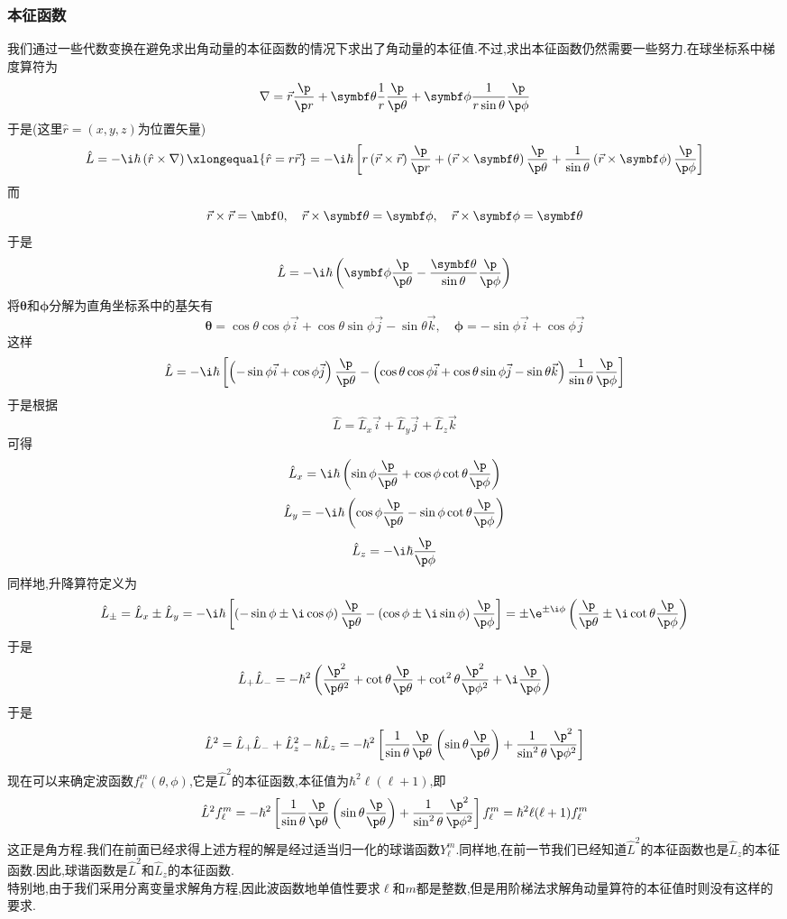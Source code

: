 \documentclass{ctexart}
\begin{document}
\subsubsection{本征函数}
我们通过一些代数变换在避免求出角动量的本征函数的情况下求出了角动量的本征值.不过,求出本征函数仍然需要一些努力.在球坐标系中梯度算符为
\[\nabla=\vec{r}\dfrac{\p}{\p r}+\symbf\theta\dfrac{1}{r}\dfrac{\p}{\p\theta}+\symbf\phi\dfrac{1}{r\sin\theta}\dfrac{\p}{\p\phi}\]
于是(这里$\hat{r}=(x,y,z)$为位置矢量)
\[\hat{L}=-\i\hbar\left(\hat{r}\times\nabla\right)\xlongequal{\hat{r}=r\vec{r}}=-\i\hbar\left[r\left(\vec{r}\times\vec{r}\right)\dfrac{\p}{\p r}+\left(\vec{r}\times\symbf\theta\right)\dfrac{\p}{\p\theta}+\dfrac{1}{\sin\theta}\left(\vec{r}\times\symbf\phi\right)\dfrac{\p}{\p\phi}\right]\]
而
\[\vec{r}\times\vec{r}=\mbf0,\quad\vec{r}\times\symbf\theta=\symbf\phi,\quad\vec{r}\times\symbf\phi=\symbf\theta\]
于是
\[\hat{L}=-\i\hbar\left(\symbf\phi\dfrac{\p}{\p\theta}-\dfrac{\symbf\theta}{\sin\theta}\dfrac{\p}{\p\phi}\right)\]
将$\symbf\theta$和$\symbf\phi$分解为直角坐标系中的基矢有
\[\symbf\theta=\cos\theta\cos\phi\vec{i}+\cos\theta\sin\phi\vec{j}-\sin\theta\vec{k},\quad\symbf\phi=-\sin\phi\vec{i}+\cos\phi\vec{j}\]
这样
\[\hat{L}=-\i\hbar\left[\left(-\sin\phi\vec{i}+\cos\phi\vec{j}\right)\dfrac{\p}{\p\theta}-\left(\cos\theta\cos\phi\vec{i}+\cos\theta\sin\phi\vec{j}-\sin\theta\vec{k}\right)\dfrac{1}{\sin\theta}\dfrac{\p}{\p\phi}\right]\]
于是根据
\[\hat{L}=\hat{L}_x\vec{i}+\hat{L}_y\vec{j}+\hat{L}_z\vec{k}\]
可得
\[\hat{L}_x=\i\hbar\left(\sin\phi\dfrac{\p}{\p\theta}+\cos\phi\cot\theta\dfrac{\p}{\p\phi}\right)\]
\[\hat{L}_y=-\i\hbar\left(\cos\phi\dfrac{\p}{\p\theta}-\sin\phi\cot\theta\dfrac{\p}{\p\phi}\right)\]
\[\hat{L}_z=-\i\hbar\dfrac{\p}{\p\phi}\]
\indent 同样地,升降算符定义为
\[\hat{L}_{\pm}=\hat{L}_x\pm\hat{L}_y=-\i\hbar\left[\left(-\sin\phi\pm\i\cos\phi\right)\dfrac{\p}{\p\theta}-\left(\cos\phi\pm\i\sin\phi\right)\dfrac{\p}{\p\phi}\right]=\pm\e^{\pm\i\phi}\left(\dfrac{\p}{\p\theta}\pm\i\cot\theta\dfrac{\p}{\p\phi}\right)\]
于是
\[\hat{L}_+\hat{L}_-=-\hbar^2\left(\dfrac{\p^2}{\p\theta^2}+\cot\theta\dfrac{\p}{\p\theta}+\cot^2\theta\dfrac{\p^2}{\p\phi^2}+\i\dfrac{\p}{\p\phi}\right)\]
于是
\[\hat{L}^2=\hat{L}_+\hat{L}_-+\hat{L}_z^2-\hbar\hat{L}_z=-\hbar^2\left[\dfrac{1}{\sin\theta}\dfrac{\p}{\p\theta}\left(\sin\theta\dfrac{\p}{\p\theta}\right)+\dfrac{1}{\sin^2\theta}\dfrac{\p^2}{\p\phi^2}\right]\]
\indent 现在可以来确定波函数$f_\ell^m(\theta,\phi)$,它是$\hat{L}^2$的本征函数,本征值为$\hbar^2\ell(\ell+1)$,即
\[\hat{L}^2f_\ell^m=-\hbar^2\left[\dfrac{1}{\sin\theta}\dfrac{\p}{\p\theta}\left(\sin\theta\dfrac{\p}{\p\theta}\right)+\dfrac{1}{\sin^2\theta}\dfrac{\p^2}{\p\phi^2}\right]f_\ell^m=\hbar^2\ell(\ell+1)f_\ell^m\]
这正是角方程.我们在前面已经求得上述方程的解是经过适当归一化的球谐函数$Y_\ell^m$.同样地,在前一节我们已经知道$\hat{L}^2$的本征函数也是$\hat{L}_z$的本征函数.因此,球谐函数是$\hat{L}^2$和$\hat{L}_z$的本征函数.\\
\indent 特别地,由于我们采用分离变量求解角方程,因此波函数地单值性要求$\ell$和$m$都是整数,但是用阶梯法求解角动量算符的本征值时则没有这样的要求.
\end{document}
